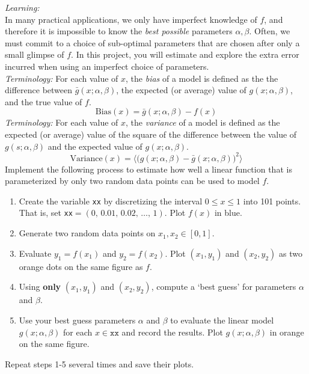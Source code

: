 \noindent\textit{Learning:}\\
In many practical applications, we only have imperfect knowledge of $f$, and therefore it is impossible to know the \textit{best possible} parameters $\alpha, \beta$. 
Often, we must commit to a choice of sub-optimal parameters that are chosen after only a small glimpse of $f$. 
In this project, you will estimate and explore the extra error incurred when using an imperfect choice of parameters.\\
\noindent\textit{Terminology:} For each value of $x$, the \textit{bias} of a model is defined as the the difference between $\bar{g}(x;\alpha,\beta)$, the expected (or average) value of $g(x;\alpha,\beta)$, and the true value of $f$.
\begin{equation}
\text{Bias}(x) = \bar{g}(x;\alpha,\beta) - f(x)
\end{equation}
\noindent\textit{Terminology:} For each value of $x$, the \textit{variance} of a model is defined as the expected (or average) value of the square of the difference between the value of $g(s;\alpha,\beta)$ and the expected value of $g(x;\alpha,\beta)$.
\begin{equation}
\text{Variance}(x) = \bigg\langle \big( g(x;\alpha,\beta) - \bar{g}(x;\alpha,\beta)\big)^2 \bigg\rangle
\end{equation}
Implement the following process to estimate how well a linear function that is parameterized by only two random data points can be used to model $f$.
\begin{enumerate}\setlength{\itemsep}{0pt}
  \item Create the variable \texttt{xx} by discretizing the interval $0 \leq x \leq 1$ into 101 points. That is, set \texttt{xx}$ = (0,\, 0.01,\, 0.02,\, \dots,\, 1)$.  Plot $f(x)$ in blue. 
    \item Generate two random data points on $x_1, x_2 \in [0,1]$. 
    \item Evaluate $y_1 =f(x_1)$ and $y_2 = f(x_2)$.  Plot $(x_1,y_1)$ and $(x_2,y_2)$ as two orange dots on the same figure as $f$. 
    \item Using \textbf{only} $(x_1,y_1)$ and $(x_2,y_2)$, compute a `best guess' for parameters $\alpha$ and $\beta$.
    \item Use your best guess parameters $\alpha$ and $\beta$ to evaluate the linear model $g(x;\alpha, \beta)$ for each $x \in \texttt{xx}$ and record the results. Plot $g(x;\alpha,\beta)$ in orange on the same figure.
\end{enumerate}
Repeat steps 1-5 several times and save their plots.\\ 

